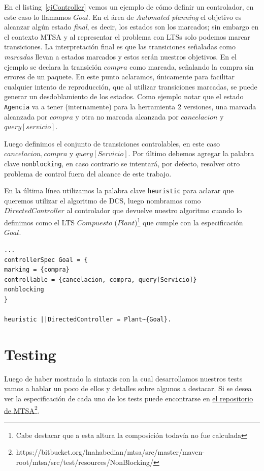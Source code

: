 En el listing~\ref{ejController} vemos un ejemplo de cómo definir un controlador, en este caso lo llamamos $Goal$. En el área de \textit{Automated planning} el objetivo es alcanzar algún estado \textit{final}, es decir, los estados son los marcados; sin embargo en el contexto MTSA y al representar el problema con LTSs solo podemos marcar transiciones. La interpretación final es que las transiciones señaladas como \textit{marcadas} llevan a estados marcados y estos serán nuestros objetivos. En el ejemplo se declara la transición $compra$ como marcada, señalando la compra sin errores de un paquete. En este punto aclaramos, únicamente para facilitar cualquier intento de reproducción, que al utilizar transiciones marcadas, se puede generar un desdoblamiento de los estados. Como ejemplo notar que el estado \texttt{Agencia} va a tener (internamente) para la herramienta 2 versiones, una marcada alcanzada por $compra$ y otra no marcada alcanzada por $cancelacion$ y $query[servicio]$.

Luego definimos el conjunto de transiciones controlables, en este caso $cancelacion, compra$ y $ query[Servicio]$. Por último debemos agregar la palabra clave \texttt{nonblocking}, en caso contrario se intentará, por defecto, resolver otro problema de control fuera del alcance de este trabajo.

En la última línea utilizamos la palabra clave \texttt{heuristic} para aclarar que queremos utilizar el algoritmo de DCS, luego nombramos como $DirectedController$ al controlador que devuelve nuestro algoritmo cuando lo definimos como el LTS $Compuesto$ ($Plant$)\footnote{Cabe destacar que a esta altura la composición todavía no fue calculada} que cumple con la especificación $Goal$.

\begin{lstlisting}[language = mtsa, caption=Ejemplo de Controller y DCS, label=ejController]
...
controllerSpec Goal = {
marking = {compra}
controllable = {cancelacion, compra, query[Servicio]}
nonblocking
}

heuristic ||DirectedController = Plant~{Goal}.
\end{lstlisting}


\section{Testing}
Luego de haber mostrado la sintaxis con la cual desarrollamos nuestros tests vamos a hablar un poco de ellos y detalles sobre algunos a destacar. Si se desea ver la especificación de cada uno de los tests puede encontrarse en \href{https://bitbucket.org/lnahabedian/mtsa/src/master/maven-root/mtsa/src/test/resources/NonBlocking/}{el repositorio de MTSA}\footnote{https://bitbucket.org/lnahabedian/mtsa/src/master/maven-root/mtsa/src/test/resources/NonBlocking/}.

